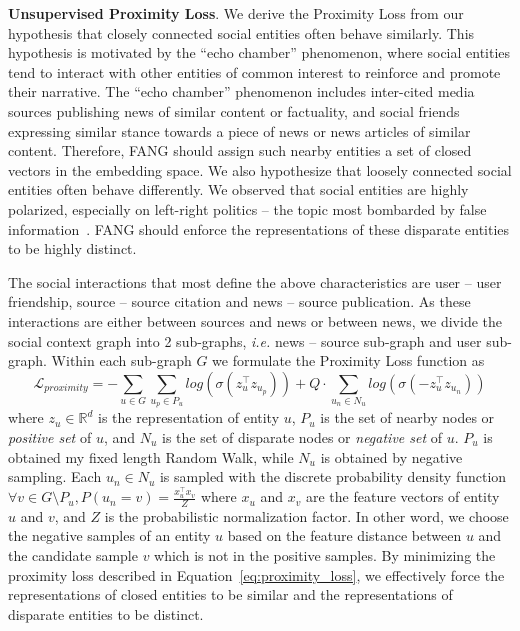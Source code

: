 \documentclass[fyp]{socreport}
\theoremstyle{definition}
\theoremstyle{hypothesis}
\begin{document}
\textbf{Unsupervised Proximity Loss}. We derive the Proximity Loss from our hypothesis that closely connected social entities often behave similarly. This hypothesis is motivated by the ``echo chamber'' phenomenon, where social entities tend to interact with other entities of common interest to reinforce and promote their narrative. The ``echo chamber'' phenomenon includes inter-cited media sources publishing news of similar content or factuality, and social friends expressing similar stance towards a piece of news or news articles of similar content. Therefore, FANG should assign such nearby entities a set of closed vectors in the embedding space. We also hypothesize that loosely connected social entities often behave differently. We observed that social entities are highly polarized, especially on left-right politics -- the topic most bombarded by false information~\cite{boxell2017internet}. FANG should enforce the representations of these disparate entities to be highly distinct.

The social interactions that most define the above characteristics are user -- user friendship, source -- source citation and news -- source publication. As these interactions are either between sources and news or between news, we divide the social context graph into 2 sub-graphs, \textit{i.e.} news -- source sub-graph and user sub-graph. Within each sub-graph $G$ we formulate the Proximity Loss function as
\begin{equation}\label{eq:proximity_loss}
    \mathcal{L}_{proximity} =  - \sum_{u\in G} \sum_{u_p\in P_u} log(\sigma(z_u^\top z_{u_p})) + Q \cdot \sum_{u_n\in N_u} log(\sigma(-z_u^\top z_{u_n}))
\end{equation}
where $z_u\in \mathbb{R}^d$ is the representation of entity $u$, $P_u$ is the set of nearby nodes or \textit{positive set} of $u$, and $N_u$ is the set of disparate nodes or \textit{negative set} of $u$. $P_u$ is obtained my fixed length Random Walk, while $N_u$ is obtained by negative sampling. Each $u_n\in N_u$ is sampled with the discrete probability density function $\forall v\in G\setminus P_u, P(u_n=v) = \frac{x_u^\top x_v}{Z}$ where $x_u$ and $x_v$ are the feature vectors of entity $u$ and $v$, and $Z$ is the probabilistic normalization factor. In other word, we choose the negative samples of an entity $u$ based on the feature distance between $u$ and the candidate sample $v$ which is not in the positive samples. By minimizing the proximity loss described in Equation~\ref{eq:proximity_loss}, we effectively force the representations of closed entities to be similar and the representations of disparate entities to be distinct.
\end{document}
